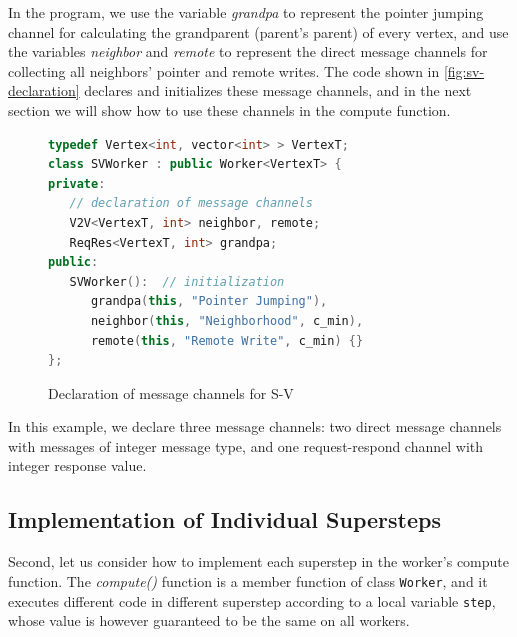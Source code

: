 \documentclass{sokendai_thesis} %
\begin{document}
In the program, we use the variable \textit{grandpa} to represent the pointer jumping channel for calculating the grandparent (parent's parent) of every vertex, and use the variables \textit{neighbor} and \textit{remote} to represent the direct message channels for collecting all neighbors' pointer and remote writes.
The code shown in \autoref{fig:sv-declaration} declares and initializes these message channels, and in the next section we will show how to use these channels in the compute function.

\begin{figure}[ht]
\centering
\vspace{-2ex}
\begin{lstlisting}[basicstyle=\small\ttfamily,numbers=none,language=c++]
typedef Vertex<int, vector<int> > VertexT;
class SVWorker : public Worker<VertexT> {
private:
   // declaration of message channels
   V2V<VertexT, int> neighbor, remote;
   ReqRes<VertexT, int> grandpa;
public:
   SVWorker():  // initialization
      grandpa(this, "Pointer Jumping"),
      neighbor(this, "Neighborhood", c_min),
      remote(this, "Remote Write", c_min) {}
};
\end{lstlisting}
\vspace{-2ex}
\caption{Declaration of message channels for S-V}
\label{fig:sv-declaration}
\end{figure}

In this example, we declare three message channels:
two direct message channels with messages of integer message type, and one request-respond channel with integer response value.

\subsection{Implementation of Individual Supersteps}

Second, let us consider how to implement each superstep in the worker's compute function.
The \emph{compute()} function is a member function of class \texttt{Worker}, and it executes different code in different superstep according to a local variable \texttt{step}, whose value is however guaranteed to be the same on all workers.
\end{document}

